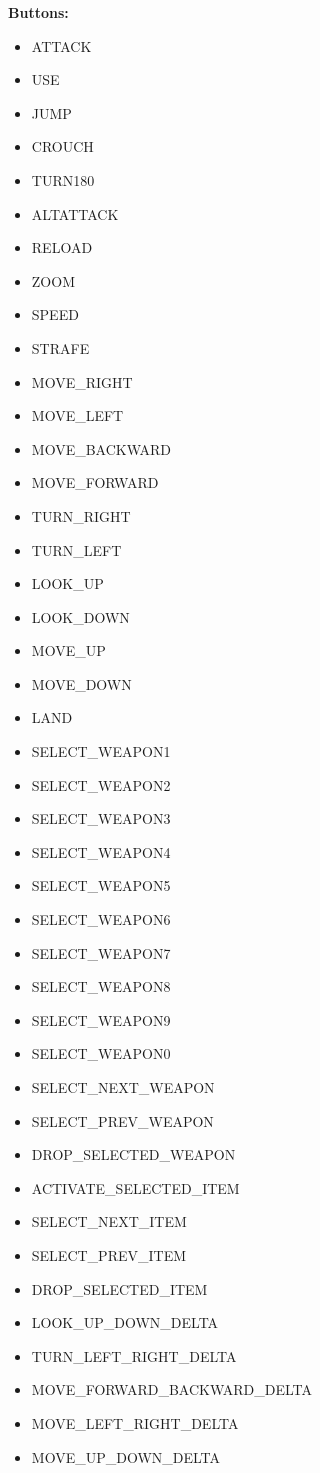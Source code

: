 \documentclass[english,bachelor,a4paper,twoside]{ppfcmthesis}
\begin{document}
\textbf{Buttons:}
\begin{itemize}
    \item ATTACK
    \item USE
    \item JUMP
    \item CROUCH
    \item TURN180
    \item ALTATTACK
    \item RELOAD
    \item ZOOM
    \item SPEED
    \item STRAFE
    \item MOVE\_RIGHT
    \item MOVE\_LEFT
    \item MOVE\_BACKWARD
    \item MOVE\_FORWARD
    \item TURN\_RIGHT
    \item TURN\_LEFT
    \item LOOK\_UP
    \item LOOK\_DOWN
    \item MOVE\_UP
    \item MOVE\_DOWN
    \item LAND
    \item SELECT\_WEAPON1
    \item SELECT\_WEAPON2
    \item SELECT\_WEAPON3
    \item SELECT\_WEAPON4
    \item SELECT\_WEAPON5
    \item SELECT\_WEAPON6
    \item SELECT\_WEAPON7
    \item SELECT\_WEAPON8
    \item SELECT\_WEAPON9
    \item SELECT\_WEAPON0
    \item SELECT\_NEXT\_WEAPON
    \item SELECT\_PREV\_WEAPON
    \item DROP\_SELECTED\_WEAPON
    \item ACTIVATE\_SELECTED\_ITEM
    \item SELECT\_NEXT\_ITEM
    \item SELECT\_PREV\_ITEM
    \item DROP\_SELECTED\_ITEM
    \item LOOK\_UP\_DOWN\_DELTA
    \item TURN\_LEFT\_RIGHT\_DELTA
    \item MOVE\_FORWARD\_BACKWARD\_DELTA
    \item MOVE\_LEFT\_RIGHT\_DELTA
    \item MOVE\_UP\_DOWN\_DELTA
\end{itemize}
\end{document}
